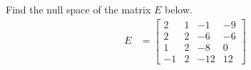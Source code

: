 Find the null space of the matrix $E$ below.
%
\begin{align*}
E&=
\begin{bmatrix}
2 & 1 & -1 & -9 \\
2 & 2 & -6 & -6 \\
1 & 2 & -8 & 0 \\
-1 & 2 & -12 & 12
\end{bmatrix}
\end{align*}
%